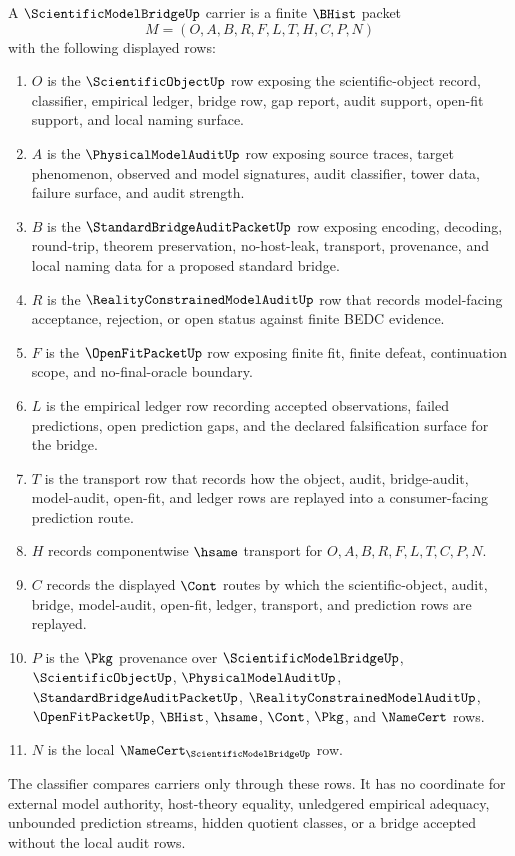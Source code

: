 \begin{definition}
\label{def:scientific-model-bridge-carrier}
A $\ScientificModelBridgeUp$ carrier is a finite $\BHist$ packet
$$
M=(O,A,B,R,F,L,T,H,C,P,N)
$$
with the following displayed rows:
\begin{enumerate}
\item $O$ is the $\ScientificObjectUp$ row exposing the scientific-object record, classifier, empirical ledger, bridge row, gap report, audit support, open-fit support, and local naming surface.
\item $A$ is the $\PhysicalModelAuditUp$ row exposing source traces, target phenomenon, observed and model signatures, audit classifier, tower data, failure surface, and audit strength.
\item $B$ is the $\StandardBridgeAuditPacketUp$ row exposing encoding, decoding, round-trip, theorem preservation, no-host-leak, transport, provenance, and local naming data for a proposed standard bridge.
\item $R$ is the $\RealityConstrainedModelAuditUp$ row that records model-facing acceptance, rejection, or open status against finite BEDC evidence.
\item $F$ is the $\OpenFitPacketUp$ row exposing finite fit, finite defeat, continuation scope, and no-final-oracle boundary.
\item $L$ is the empirical ledger row recording accepted observations, failed predictions, open prediction gaps, and the declared falsification surface for the bridge.
\item $T$ is the transport row that records how the object, audit, bridge-audit, model-audit, open-fit, and ledger rows are replayed into a consumer-facing prediction route.
\item $H$ records componentwise $\hsame$ transport for $O,A,B,R,F,L,T,C,P,N$.
\item $C$ records the displayed $\Cont$ routes by which the scientific-object, audit, bridge, model-audit, open-fit, ledger, transport, and prediction rows are replayed.
\item $P$ is the $\Pkg$ provenance over $\ScientificModelBridgeUp$, $\ScientificObjectUp$, $\PhysicalModelAuditUp$, $\StandardBridgeAuditPacketUp$, $\RealityConstrainedModelAuditUp$, $\OpenFitPacketUp$, $\BHist$, $\hsame$, $\Cont$, $\Pkg$, and $\NameCert$ rows.
\item $N$ is the local $\NameCert_{\ScientificModelBridgeUp}$ row.
\end{enumerate}
The classifier compares carriers only through these rows. It has no coordinate for external model authority, host-theory equality, unledgered empirical adequacy, unbounded prediction streams, hidden quotient classes, or a bridge accepted without the local audit rows.
\end{definition}

